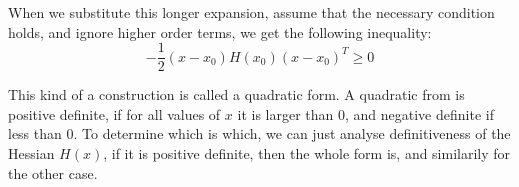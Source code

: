 When we substitute this longer expansion, assume that the necessary condition holds, and ignore higher order terms, we get the following inequality:
\begin{equation}
-\frac{1}{2} (x-x_0)H(x_0)(x-x_0)^{T} \ge 0
\end{equation}

This kind of a construction is called a quadratic form. A quadratic from is positive definite, if for all values of $x$ it is larger than 0, and negative definite if less than 0. To determine which is which, we can just analyse definitiveness of the Hessian  $H(x)$, if it is positive definite, then the whole form is, and similarily for the other case.


